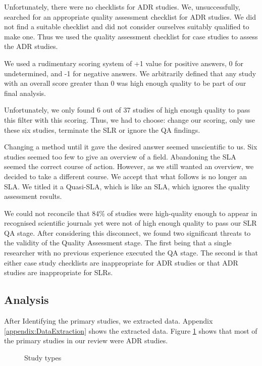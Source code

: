 Unfortunately, there were no checklists for ADR studies.
We, unsuccessfully, searched for an appropriate quality assessment checklist for ADR studies.
We did not find a suitable checklist and did not consider ourselves suitably qualified to make one.
Thus we used the quality assessment checklist for case studies to assess the ADR studies.

We used a rudimentary scoring system of +1 value for positive answers, 0 for undetermined, and -1 for negative answers.
We arbitrarily defined that any study with an overall score greater than 0 was high enough quality to be part of our final analysis.

Unfortunately, we only found 6 out of 37 studies of high enough quality to pass this filter with this scoring.
Thus, we had to choose: change our scoring, only use these six studies, terminate the SLR or ignore the QA findings.

Changing a method until it gave the desired answer seemed unscientific to us.
Six studies seemed too few to give an overview of a field.
Abandoning the SLA seemed the correct course of action.
However, as we still wanted an overview, we decided to take a different course.
We accept that what follows is no longer an SLA. 
We titled it a Quasi-SLA, which is like an SLA, which ignores the quality assessment results.

We could not reconcile that 84\% of studies were high-quality enough to appear in recognised scientific journals yet were not of high enough quality to pass our SLR QA stage.
After considering this disconnect, we found two significant threats to the validity of the Quality Assessment stage.
The first being that a single researcher with no previous experience executed the QA stage.
The second is that either case study checklists are inappropriate for ADR studies or that ADR studies are inappropriate for SLRs.


\subsection{Analysis}
After Identifying the primary studies, we extracted data.
Appendix \ref{appendix:DataExtraction} shows the extracted data.
Figure \ref{fig:study_types} shows that most of the primary studies in our review were ADR studies.

\begin{figure}[h]
    \centering
    \caption{Study types}
    \label{fig:study_types}
\end{figure}

